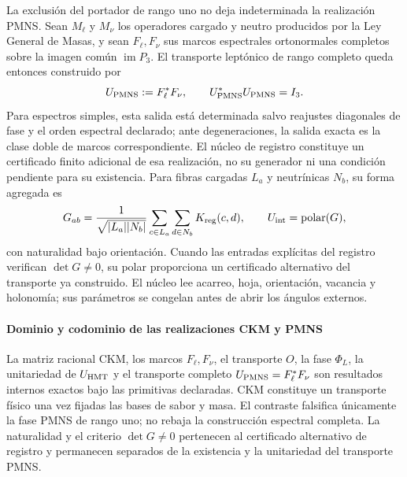 La exclusión del portador de rango uno no deja indeterminada la realización
PMNS. Sean \(M_\ell\) y \(M_\nu\) los operadores cargado y neutro producidos
por la Ley General de Masas, y sean \(F_\ell,F_\nu\) sus marcos espectrales
ortonormales completos sobre la imagen común \(\operatorname{im}P_3\). El
transporte leptónico de rango completo queda entonces construido por
\[
 U_{\rm PMNS}:=F_\ell^*F_\nu,
 \qquad
 U_{\rm PMNS}^*U_{\rm PMNS}=I_3.
\]
Para espectros simples, esta salida está determinada salvo reajustes
diagonales de fase y el orden espectral declarado; ante degeneraciones, la
salida exacta es la clase doble de marcos correspondiente. El núcleo de
registro constituye un certificado finito adicional de esa realización, no
su generador ni una condición pendiente para su existencia. Para fibras
cargadas \(L_a\) y neutrínicas \(N_b\), su forma agregada es
\[
 G_{ab}=\frac{1}{\sqrt{|L_a||N_b|}}
 \sum_{c\in L_a}\sum_{d\in N_b}K_{\rm reg}(c,d),
 \qquad U_{\rm int}=\operatorname{polar}(G),
\]
con naturalidad bajo orientación. Cuando las entradas explícitas del registro
verifican \(\det G\ne0\), su polar proporciona un certificado alternativo del
transporte ya construido. El núcleo lee acarreo, hoja, orientación, vacancia
y holonomía; sus parámetros se congelan antes de abrir los ángulos externos.

\paragraph{Dominio y codominio de las realizaciones CKM y PMNS}
La matriz racional CKM, los marcos \(F_\ell,F_\nu\), el transporte \(O\), la
fase \(\Phi_L\), la unitariedad de \(U_{\rm HMT}\) y el transporte completo
\(U_{\rm PMNS}=F_\ell^*F_\nu\) son resultados internos exactos bajo las
primitivas declaradas. CKM constituye un transporte físico una vez fijadas
las bases de sabor y masa. El contraste falsifica únicamente la fase PMNS de
rango uno; no rebaja la construcción espectral completa. La naturalidad y el
criterio \(\det G\ne0\) pertenecen al certificado alternativo de registro y
permanecen separados de la existencia y la unitariedad del transporte PMNS.
